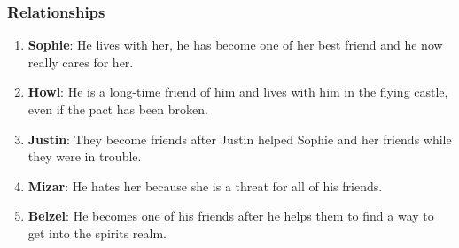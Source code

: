 




\subsubsection*{Relationships}
\begin{enumerate}
\item \textbf{Sophie}: He lives with her, he has become one of her best friend and he now really cares for her.
\item \textbf{Howl}: He is a long-time friend of him and lives with him in the flying castle, even if the pact has been broken.
\item \textbf{Justin}: They become friends after Justin helped Sophie and her friends while they were in trouble.
\item \textbf{Mizar}: He hates her because she is a threat for all of his friends.
\item \textbf{Belzel}: He becomes one of his friends after he helps them to find a way to get into the spirits realm.
\end{enumerate}

